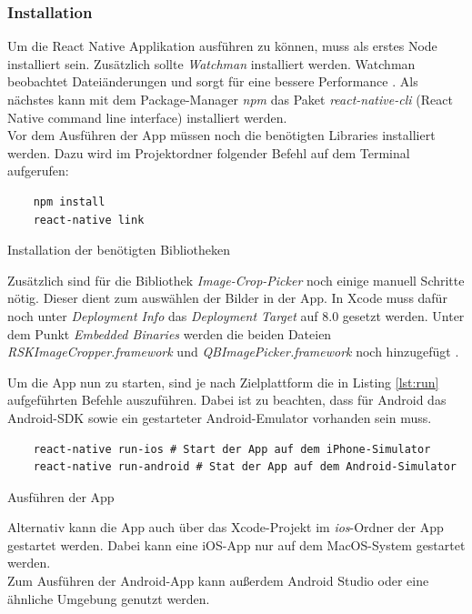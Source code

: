         \subsubsection{Installation}
Um die React Native Applikation ausführen zu können, muss als erstes Node installiert sein. Zusätzlich sollte \textit{Watchman} installiert werden. Watchman beobachtet Dateiänderungen und sorgt für eine bessere Performance \cite{facebook_inc._start_2017}. Als nächstes kann mit dem Package-Manager \textit{npm} das Paket \textit{react-native-cli} (React Native command line interface) installiert werden. \\

Vor dem Ausführen der App müssen noch die benötigten Libraries installiert werden. Dazu wird im Projektordner folgender Befehl auf dem Terminal aufgerufen:
\begin{listing}[H]
    \begin{verbatim}
    npm install
    react-native link
    \end{verbatim}
    \caption{Installation der benötigten Bibliotheken}
    \label{lst:npm_linstall}
\end{listing}
Zusätzlich sind für die Bibliothek \textit{Image-Crop-Picker } noch einige manuell Schritte nötig. Dieser dient zum auswählen der Bilder in der App. In Xcode muss dafür noch unter \textit{Deployment Info} das \textit{Deployment Target} auf 8.0 gesetzt werden. Unter dem Punkt \textit{Embedded Binaries} werden die beiden Dateien \textit{RSKImageCropper.framework} und \textit{QBImagePicker.framework} noch hinzugefügt \cite{pusic_crop_2017}.

Um die App nun zu starten, sind je nach Zielplattform die in Listing \ref{lst:run} aufgeführten Befehle auszuführen. Dabei ist zu beachten, dass für Android das Android-SDK sowie ein gestarteter Android-Emulator vorhanden sein muss.
\begin{listing}[H]
    \begin{verbatim}
    react-native run-ios # Start der App auf dem iPhone-Simulator
    react-native run-android # Stat der App auf dem Android-Simulator
    \end{verbatim}
    \caption{Ausführen der App}
    \label{lst:run}
\end{listing}

Alternativ kann die App auch über das Xcode-Projekt im \textit{ios}-Ordner der App gestartet werden. Dabei kann eine iOS-App nur auf dem MacOS-System gestartet werden. \cite{facebook_inc._start_2017}\\
Zum Ausführen der Android-App kann außerdem Android Studio oder eine ähnliche Umgebung genutzt werden.

